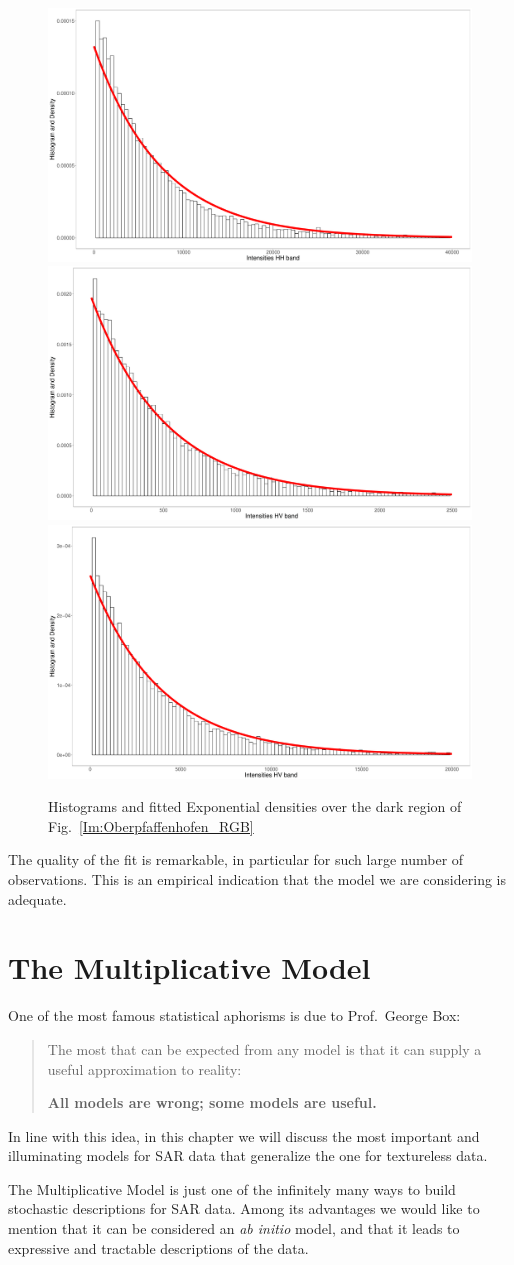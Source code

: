 \documentclass{beamer}
\begin{document}
\begin{frame}[allowframebreaks]
\begin{figure}
\centering
\includegraphics[width=.32\linewidth]{darkHHfit}
\includegraphics[width=.32\linewidth]{darkHVfit}
\includegraphics[width=.32\linewidth]{darkVVfit}
\caption{Histograms and fitted Exponential densities over the dark region of Fig.~\ref{Im:Oberpfaffenhofen_RGB}}\label{Fig:FittedDarkRegion}
\end{figure}

The quality of the fit is remarkable, in particular for such large number of observations.
This is an empirical indication that the model we are considering is adequate.
\end{frame}


\section{The Multiplicative Model}

\begin{frame}[allowframebreaks]
One of the most famous statistical aphorisms is due to Prof.~George Box:
\begin{quotation}
The most that can be expected from any model is that it can supply a useful approximation to reality:

\textbf{All models are wrong; some models are useful.}
\end{quotation}
In line with this idea, in this chapter we will discuss the most important and illuminating models for SAR data that generalize the one for textureless data.

The Multiplicative Model is just one of the infinitely many ways to build stochastic descriptions for SAR data.
Among its advantages we would like to mention that it can be considered an \textit{ab initio} model, and that it leads to expressive and tractable descriptions of the data.
\end{frame}
\end{document}
